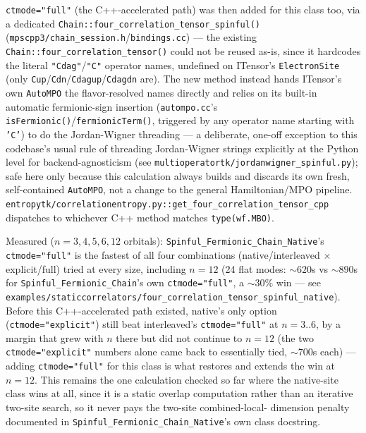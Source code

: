 \documentclass[11pt]{article}
\begin{document}
\texttt{ctmode="full"} (the C++-accelerated path) was then added for
this class too, via a dedicated
\texttt{Chain::four\_correlation\_tensor\_spinful()}
(\texttt{mpscpp3/chain\_session.h}/\texttt{bindings.cc}) --- the
existing \texttt{Chain::four\_correlation\_tensor()} could not be
reused as-is, since it hardcodes the literal \texttt{"Cdag"}/\texttt{"C"}
operator names, undefined on ITensor's \texttt{ElectronSite} (only
\texttt{Cup}/\texttt{Cdn}/\texttt{Cdagup}/\texttt{Cdagdn} are). The new
method instead hands ITensor's own \texttt{AutoMPO} the flavor-resolved
names directly and relies on its built-in automatic fermionic-sign
insertion (\texttt{autompo.cc}'s
\texttt{isFermionic()}/\texttt{fermionicTerm()}, triggered by any
operator name starting with \texttt{'C'}) to do the Jordan-Wigner
threading --- a deliberate, one-off exception to this codebase's usual
rule of threading Jordan-Wigner strings explicitly at the Python level
for backend-agnosticism (see
\texttt{multioperatortk/jordanwigner\_spinful.py}); safe here only
because this calculation always builds and discards its own fresh,
self-contained \texttt{AutoMPO}, not a change to the general
Hamiltonian/MPO pipeline.
\texttt{entropytk/correlationentropy.py::get\_four\_correlation\_tensor\_cpp}
dispatches to whichever C++ method matches \texttt{type(wf.MBO)}.

Measured ($n=3,4,5,6,12$ orbitals):
\texttt{Spinful\_Fermionic\_Chain\_Native}'s \texttt{ctmode="full"} is
the fastest of all four combinations (native/interleaved $\times$
explicit/full) tried at every size, including $n=12$ (24 flat modes:
$\sim620$s vs $\sim890$s for \texttt{Spinful\_Fermionic\_Chain}'s own
\texttt{ctmode="full"}, a $\sim30\%$ win --- see
\texttt{examples/staticcorrelators/four\_correlation\_tensor\_spinful\_native}). Before
this C++-accelerated path existed, native's only option
(\texttt{ctmode="explicit"}) still beat interleaved's
\texttt{ctmode="full"} at $n=3..6$, by a margin that grew with $n$
there but did not continue to $n=12$ (the two
\texttt{ctmode="explicit"} numbers alone came back to essentially
tied, $\sim700$s each) --- adding \texttt{ctmode="full"} for this class
is what restores and extends the win at $n=12$. This remains the one
calculation checked so far where the native-site class wins at all,
since it is a static overlap computation rather than an iterative
two-site search, so it never pays the two-site combined-local-
dimension penalty documented in
\texttt{Spinful\_Fermionic\_Chain\_Native}'s own class docstring.
\end{document}

